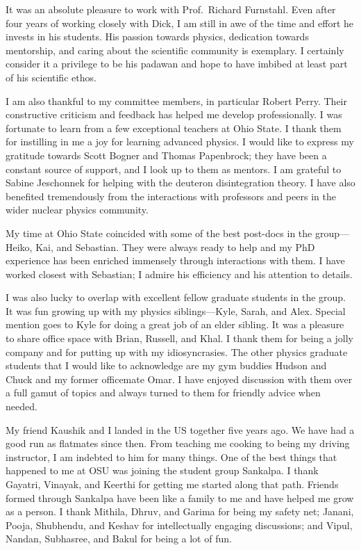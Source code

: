 \begin{acknowledgments}

  It was an absolute pleasure to work with Prof.\ Richard Furnstahl.  Even after
  four years of working closely with Dick, I am still in awe of the time and
  effort he invests in his students.  His passion towards physics, dedication
  towards mentorship, and caring about the scientific community is exemplary.
  I certainly consider it a privilege to be his padawan and hope to have
  imbibed at least part of his scientific ethos.

  I am also thankful to my committee members, in particular Robert
  Perry.  Their constructive criticism and feedback has helped me develop
  professionally.  I was fortunate to learn from a few exceptional
  teachers at Ohio State.  I thank them for instilling in me a joy for learning
  advanced physics.  I would like to express my gratitude towards
  Scott Bogner and Thomas Papenbrock; they have been a constant source of
  support, and I look up to them as mentors.  I am grateful to
  Sabine Jeschonnek for helping with the deuteron disintegration theory.
  I have also benefited tremendously from the interactions with professors
  and peers in the wider nuclear physics community.

  My time at Ohio State coincided with some of the best
  post-docs in the group---Heiko, Kai, and Sebastian.  They were always ready
  to help and my PhD experience has
  been enriched immensely through interactions with them.  I have worked
  closest with Sebastian; I admire his efficiency and his attention to details.

  I was also lucky to overlap with excellent fellow graduate students in the group.
  It was fun growing up with my physics siblings---Kyle, Sarah, and Alex.
  Special mention goes to Kyle for doing a great job of an elder sibling.
  It was a pleasure to share office space with Brian, Russell, and Khal.
  I thank them for being a jolly company and for putting up with my
  idiosyncrasies.  The other physics graduate students that I would like
  to acknowledge are my gym buddies Hudson and Chuck and my former officemate
  Omar.  I have enjoyed discussion with them over a full gamut of topics and
  always turned to them for friendly advice when needed.

  My friend Kaushik and I landed in the US together five years ago.  We have had
  a good run as flatmates since then.  From teaching me cooking to being my
  driving
  instructor, I am indebted to him for many things.  One of the best things
  that happened to me at OSU was joining the student group Sankalpa.  I thank
  Gayatri, Vinayak, and Keerthi for getting me started along that path.
  Friends formed through Sankalpa have been like a family to me and have
  helped me grow as a person.  I thank Mithila, Dhruv, and Garima for being
  my safety net; Janani, Pooja, Shubhendu, and Keshav for intellectually
  engaging discussions; and Vipul, Nandan, Subhasree, and Bakul for being
  a lot of fun.


\end{acknowledgments}
